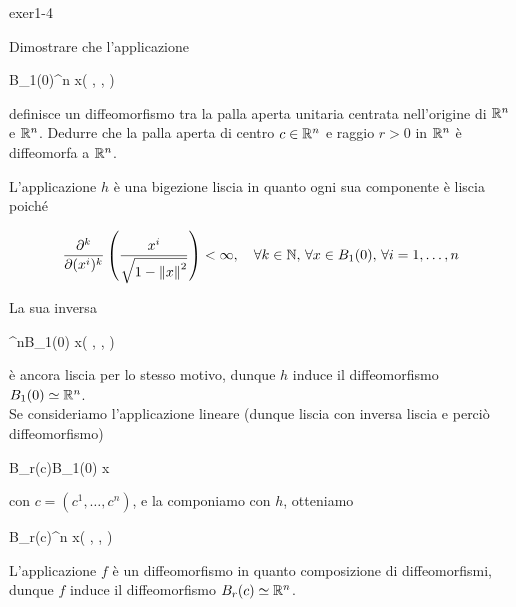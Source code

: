 {exer1-4}
{
Dimostrare che l'applicazione

	{B_{1}(0)}{\R^{n}}
	{x}{\left( , \cdots,  \right)}

definisce un diffeomorfismo tra la palla aperta unitaria centrata nell'origine di $ \mathbb{R}^{n} $ e $ \mathbb{R}^{n} $. Dedurre che la palla aperta di centro $ c \in \mathbb{R}^{n} $ e raggio $ r > 0 $ in $ \mathbb{R}^{n} $ è diffeomorfa a $ \mathbb{R}^{n} $.
}
{
L'applicazione $ h $ è una bigezione liscia in quanto ogni sua componente è liscia poiché

\begin{equation}
	\pdv[k]{(x^{i})} \left( \dfrac{x^{i}}{\sqrt{ 1-\norm{x}^{2} }} \right) < \infty %
	\qcomma \forall k \in \N, \, \forall x \in B_{1}(0), \, \forall i=1,\dots,n
\end{equation}

La sua inversa

	{\R^{n}}{B_{1}(0)}
	{x}{\left( , \cdots,  \right)}

è ancora liscia per lo stesso motivo, dunque $ h $ induce il diffeomorfismo $ B_{1}(0) \simeq \mathbb{R}^{n} $. \\
Se consideriamo l'applicazione lineare (dunque liscia con inversa liscia e perciò diffeomorfismo)

	{B_{r}(c)}{B_{1}(0)}
	{x}{}

con $ c = (c^{1},\dots,c^{n}) $, e la componiamo con $ h $, otteniamo

	{B_{r}(c)}{\R^{n}}
	{x}{\left( , \cdots,  \right)}

L'applicazione $ f $ è un diffeomorfismo in quanto composizione di diffeomorfismi, dunque $ f $ induce il diffeomorfismo $ B_{r}(c) \simeq \mathbb{R}^{n} $.
}


